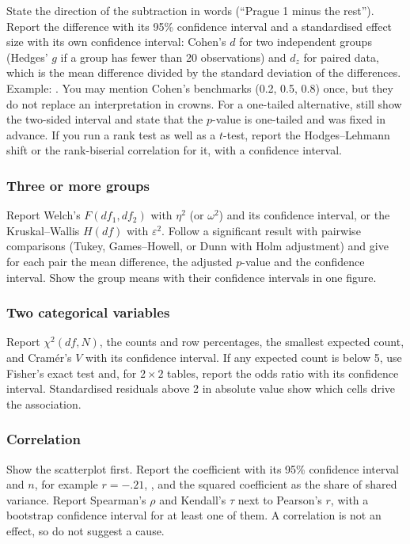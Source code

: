 \documentclass[11pt,a4paper]{article}
\begin{document}
State the direction of the subtraction in words (``Prague 1 minus the rest''). Report the difference with its 95\% confidence interval and a standardised effect size with its own confidence interval: Cohen's $d$ for two independent groups (Hedges' $g$ if a group has fewer than 20 observations) and $d_z$ for paired data, which is the mean difference divided by the standard deviation of the differences. Example: . You may mention Cohen's benchmarks (0.2, 0.5, 0.8) once, but they do not replace an interpretation in crowns. For a one-tailed alternative, still show the two-sided interval and state that the $p$-value is one-tailed and was fixed in advance. If you run a rank test as well as a $t$-test, report the Hodges--Lehmann shift or the rank-biserial correlation for it, with a confidence interval.

\subsubsection*{Three or more groups}

Report Welch's $F(df_1,df_2)$ with $\eta^2$ (or $\omega^2$) and its confidence interval, or the Kruskal--Wallis $H(df)$ with $\varepsilon^2$. Follow a significant result with pairwise comparisons (Tukey, Games--Howell, or Dunn with Holm adjustment) and give for each pair the mean difference, the adjusted $p$-value and the confidence interval. Show the group means with their confidence intervals in one figure.

\subsubsection*{Two categorical variables}

Report $\chi^2(df,N)$, the counts and row percentages, the smallest expected count, and Cram\'er's $V$ with its confidence interval. If any expected count is below 5, use Fisher's exact test and, for $2\times2$ tables, report the odds ratio with its confidence interval. Standardised residuals above 2 in absolute value show which cells drive the association.

\subsubsection*{Correlation}

Show the scatterplot first. Report the coefficient with its 95\% confidence interval and $n$, for example $r=-.21$, , and the squared coefficient as the share of shared variance. Report Spearman's $\rho$ and Kendall's $\tau$ next to Pearson's $r$, with a bootstrap confidence interval for at least one of them. A correlation is not an effect, so do not suggest a cause.
\end{document}
